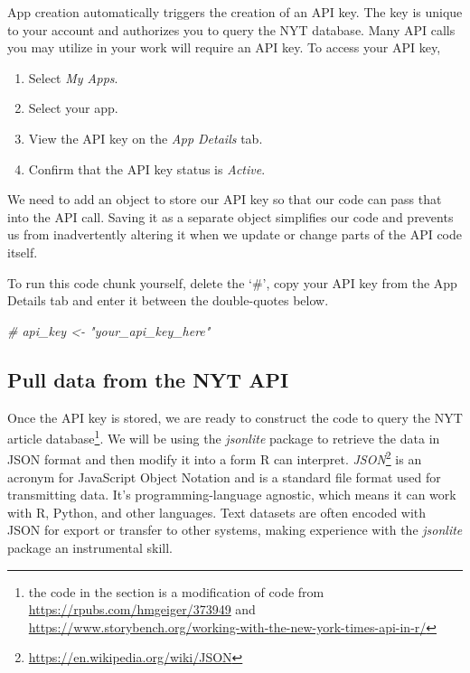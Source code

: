 \documentclass[
  krantz2]{krantz}
\makeatletter
\newenvironment{Shaded}{\begin{snugshade}}{\end{snugshade}}
\newcommand{\CommentTok}[1]{\textcolor[rgb]{0.37,0.37,0.37}{\textit{#1}}}
\providecommand{\tightlist}{%
  \setlength{\itemsep}{0pt}\setlength{\parskip}{0pt}}
\newenvironment{kframe}{%
\medskip{}
\setlength{\fboxsep}{.8em}
 \def\at@end@of@kframe{}%
 \ifinner\ifhmode%
  \def\at@end@of@kframe{\end{minipage}}%
  \begin{minipage}{\columnwidth}%
 \fi\fi%
 \def\FrameCommand##1{\hskip\@totalleftmargin \hskip-\fboxsep
 \colorbox{shadecolor}{##1}\hskip-\fboxsep
     \hskip-\linewidth \hskip-\@totalleftmargin \hskip\columnwidth}%
 \MakeFramed {\advance\hsize-\width
   \@totalleftmargin\z@ \linewidth\hsize
   \@setminipage}}%
 {\par\unskip\endMakeFramed%
 \at@end@of@kframe}
\renewenvironment{Shaded}{\begin{kframe}}{\end{kframe}}
\makeatother
\begin{document}
App creation automatically triggers the creation of an API key. The key is unique to your account and authorizes you to query the NYT database. Many API calls you may utilize in your work will require an API key. To access your API key\citep{get-started},

\begin{enumerate}
\def\labelenumi{\arabic{enumi}.}
\tightlist
\item
  Select \emph{My Apps}.
\item
  Select your app.
\item
  View the API key on the \emph{App Details} tab.
\item
  Confirm that the API key status is \emph{Active}.
\end{enumerate}

We need to add an object to store our API key so that our code can pass that into the API call. Saving it as a separate object simplifies our code and prevents us from inadvertently altering it when we update or change parts of the API code itself.

To run this code chunk yourself, delete the `\#', copy your API key from the App Details tab and enter it between the double-quotes below.

\begin{Shaded}
\begin{Highlighting}[]
\CommentTok{\# api\_key \textless{}{-} "your\_api\_key\_here"}
\end{Highlighting}
\end{Shaded}

\hypertarget{api-pull}{%
\subsection{Pull data from the NYT API}\label{api-pull}}

Once the API key is stored, we are ready to construct the code to query the NYT article database\footnote{the code in the section is a modification of code from \url{https://rpubs.com/hmgeiger/373949} and \url{https://www.storybench.org/working-with-the-new-york-times-api-in-r/}}. We will be using the \emph{jsonlite} package to retrieve the data in JSON format and then modify it into a form R can interpret. \emph{JSON}\footnote{\url{https://en.wikipedia.org/wiki/JSON}} is an acronym for JavaScript Object Notation and is a standard file format used for transmitting data. It's programming-language agnostic, which means it can work with R, Python, and other languages. Text datasets are often encoded with JSON for export or transfer to other systems, making experience with the \emph{jsonlite} package an instrumental skill.
\end{document}
